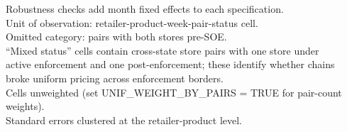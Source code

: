 \begin{table}[htbp]
   \par \raggedright 
   Robustness checks add month fixed effects to each specification.\\
   Unit of observation: retailer-product-week-pair-status cell.\\
   Omitted category: pairs with both stores pre-SOE.\\
   ``Mixed status'' cells contain cross-state store pairs with one store under\\
   active enforcement and one post-enforcement; these identify whether chains\\
   broke uniform pricing across enforcement borders.\\
   Cells unweighted (set UNIF\_WEIGHT\_BY\_PAIRS = TRUE for pair-count weights).\\
   Standard errors clustered at the retailer-product level.
\end{table}


